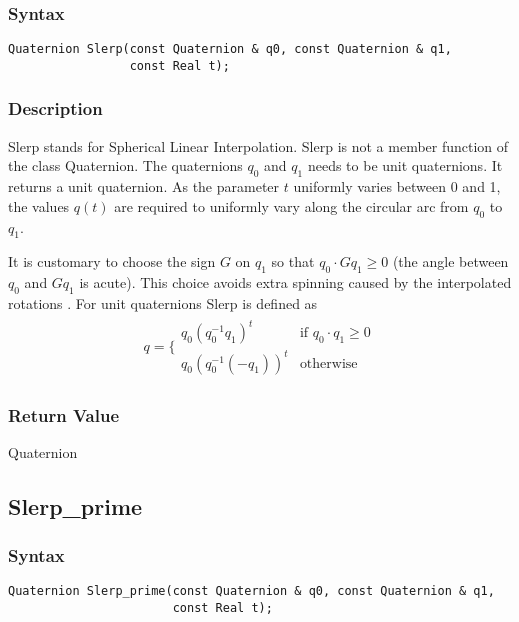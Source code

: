 \documentclass[dvips,11pt,fleqn]{report}
\begin{document}
\subsubsection*{Syntax}
\begin{verbatim}
Quaternion Slerp(const Quaternion & q0, const Quaternion & q1, 
                 const Real t);
\end{verbatim}
\subsubsection{Description}
Slerp stands for Spherical Linear Interpolation.  Slerp is not a
member function of the class Quaternion.  The quaternions $q_0$ and
$q_1$ needs to be unit quaternions.  It returns a unit quaternion. As
the parameter $t$ uniformly varies between 0 and 1, the values $q(t)$
are required to uniformly vary along the circular arc from $q_0$ to
$q_1$.

It is customary to choose the sign $G$ on $q_1$ so that $q_0 \cdot
Gq_1 \geq 0$ (the angle between $q_0$ and $Gq_1$ is acute). This
choice avoids extra spinning caused by the interpolated rotations
\cite{Dam98}. For unit quaternions Slerp is defined as
\begin{eqnarray}
 q = \Bigg\{
  \begin{array}{cc}
    q_0(q_0^{-1}q_1)^t & \textrm{if $q_0 \cdot q_1 \geq 0$} \\
    q_0(q_0^{-1}(-q_1))^t & \textrm{otherwise} 
  \end{array}
\end{eqnarray}


\subsubsection*{Return Value}

Quaternion

\newpage

\subsection*{Slerp\_prime}

\subsubsection*{Syntax}
\begin{verbatim}
Quaternion Slerp_prime(const Quaternion & q0, const Quaternion & q1, 
                       const Real t);
\end{verbatim}
\end{document}
